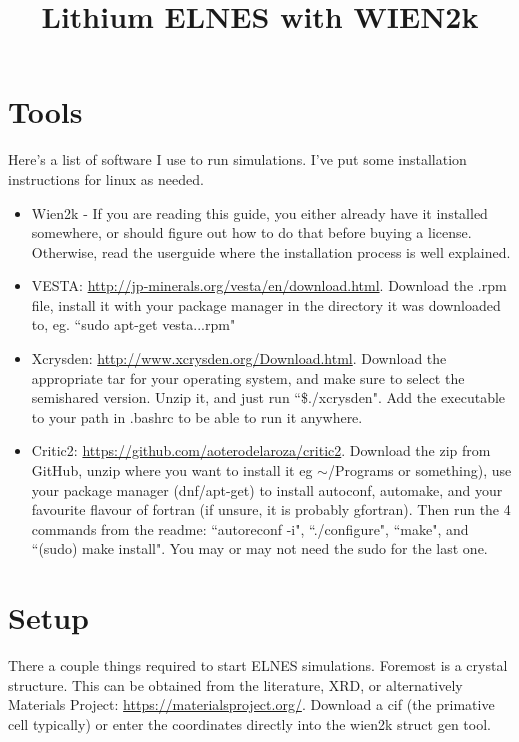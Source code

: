 \documentclass[12pt]{article}
\title{Lithium ELNES with WIEN2k}
\begin{document}
\maketitle

\tableofcontents

\section{Tools}	
Here's a list of software I use to run simulations.  I've put some installation instructions for linux as needed.  

\begin{itemize}
	\item Wien2k  - If you are reading this guide, you either already have it installed somewhere, or should figure out how to do that before buying a license.  Otherwise, read the userguide where the installation process is well explained. 
	
	\item  VESTA: \url{http://jp-minerals.org/vesta/en/download.html}.  Download the .rpm file, install it with your package manager in the directory it was downloaded to, eg. ``sudo apt-get vesta...rpm"
	
	\item Xcrysden: \url{http://www.xcrysden.org/Download.html}.  Download the appropriate tar for your operating system, and make sure to select the semishared version.  Unzip it, and just run ``\$./xcrysden".  Add the executable to your path in .bashrc to be able to run it anywhere.
	
	\item Critic2: \url{https://github.com/aoterodelaroza/critic2}.  Download the zip from GitHub, unzip where you want to install it eg $\sim$/Programs or something), use your package manager (dnf/apt-get) to install  autoconf, automake, and your favourite flavour of fortran (if unsure, it is probably gfortran).  Then run the 4 commands from the readme: ``autoreconf -i", ``./configure", ``make", and ``(sudo) make install".   You may or may not need the sudo for the last one. 
	
\end{itemize}
	
\section{Setup}	

There a couple things required to start ELNES simulations.  Foremost is a crystal structure.  This can be obtained from the literature, XRD, or alternatively Materials Project: \url{https://materialsproject.org/}.  Download a cif (the primative cell typically) or enter the coordinates directly into the wien2k struct gen tool.  \\
\end{document}
